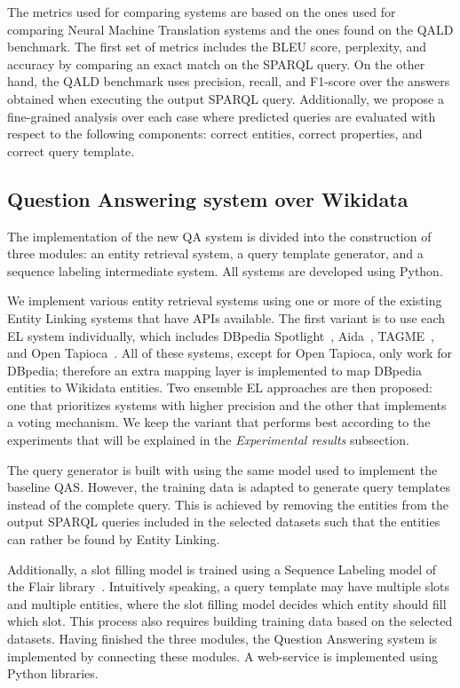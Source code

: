 The metrics used for comparing systems are based on the ones used for comparing Neural 
Machine Translation systems and the ones found on the QALD benchmark. The first set of 
metrics includes the BLEU score, perplexity, and accuracy by comparing an exact match on 
the SPARQL query. On the other hand, the QALD benchmark uses precision, recall, and F1-score 
over the answers obtained when executing the output SPARQL query. Additionally, 
we propose a fine-grained analysis over each case where predicted queries are evaluated with 
respect to the following components: correct entities, correct properties, and correct query 
template.

\subsection*{Question Answering system over Wikidata}
The implementation of the new QA system is divided into the construction of three modules: 
an entity retrieval system, a query template generator, and a sequence labeling intermediate 
system. All systems are developed using Python.

We implement various entity retrieval systems using one or more of the existing Entity 
Linking systems that have APIs available. The first variant is to use each EL system individually, 
which includes DBpedia Spotlight~\cite{EL:dbpedia-spotlight-MendesJGB11}, Aida~\cite{EL:aida-tool-YosefHBSW11}, 
TAGME~\cite{EL:tagme-FerraginaS10}, and Open Tapioca~\cite{EL:opentapioca-Delpeuch19}. 
All of these systems, except for Open Tapioca, only work for DBpedia; therefore an 
extra mapping layer is implemented to map DBpedia entities to Wikidata entities. Two ensemble 
EL approaches are then proposed: one that prioritizes systems with higher precision 
and the other that implements a voting mechanism. We keep the variant that performs best 
according to the experiments that will be explained in the \textit{Experimental results} subsection.

The query generator is built with using the same model used to implement the baseline QAS. 
However, the training data is adapted to generate query templates instead of the complete 
query. This is achieved by removing the entities from the output SPARQL queries included 
in the selected datasets such that the entities can rather be found by Entity Linking.

Additionally, a slot filling model is trained using a Sequence Labeling model of the Flair 
library~\cite{seqlab:flair-AkbikBBRSV19}. Intuitively speaking, a query template may have 
multiple slots and multiple entities, where the slot filling model decides which entity should fill which slot.
This process also requires building training data based on the selected datasets. 
Having finished the three modules, the Question Answering system is implemented by 
connecting these modules. A web-service is implemented using Python libraries.

